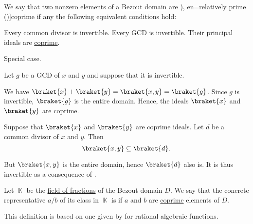 \begin{definition}\label{def:coprime_elements}\mimprovised
  We say that two nonzero elements of a \hyperref[def:bezout_domain]{Bezout domain} are \term[ru=взаимно простые (идеалы) (\cite[120]{Винберг2014Алгебра}), en=relatively prime (\cite[113]{Lang2002Algebra})]{coprime} if any the following equivalent conditions hold:
  \begin{thmenum}
     Every common divisor is invertible.
     Every GCD is invertible.
     Their principal ideals are \hyperref[def:semiring_ideal/coprime]{coprime}.
  \end{thmenum}
\end{definition}
\begin{defproof}
   Special case.

   Let \( g \) be a GCD of \( x \) and \( y \) and suppose that it is invertible.

  We have \( \braket{ x } + \braket{ y } = \braket{ x, y } = \braket{ g } \). Since \( g \) is invertible, \( \braket{ g } \) is the entire domain. Hence, the ideals \( \braket{ x } \) and \( \braket{ y } \) are coprime.

   Suppose that \( \braket{ x } \) and \( \braket{ y } \) are coprime ideals. Let \( d \) be a common divisor of \( x \) and \( y \). Then
  \begin{equation*}
    \braket{ x, y } \subseteq \braket{ d }.
  \end{equation*}

  But \( \braket{ x, y } \) is the entire domain, hence \( \braket{ d } \) also is. It is thus invertible as a consequence of .
\end{defproof}

\begin{definition}\label{def:lowest_terms}\mimprovised
  Let \( \BbbK \) be the \hyperref[def:field_of_fractions]{field of fractions} of the Bezout domain \( D \). We say that the concrete representative \( a / b \) of its class in \( \BbbK \) is  if \( a \) and \( b \) are \hyperref[def:coprime_elements]{coprime} elements of \( D \).
\end{definition}
\begin{comments}
  \item This definition is based on one given by  for rational algebraic functions.
\end{comments}

